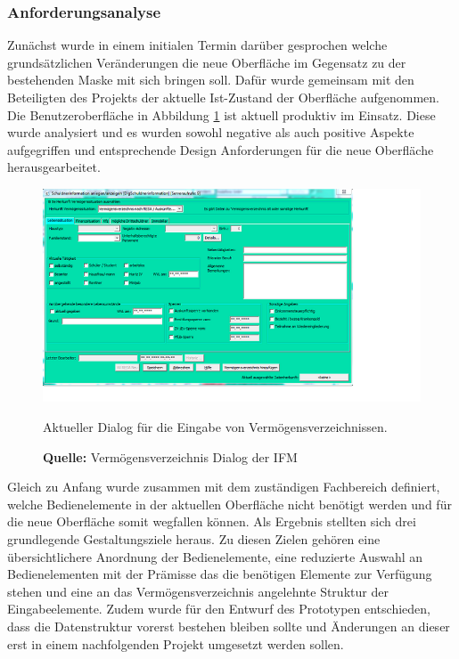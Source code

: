 \subsubsection{Anforderungsanalyse}
Zunächst wurde in einem initialen Termin darüber gesprochen welche grundsätzlichen Veränderungen die neue Oberfläche im Gegensatz zu der bestehenden Maske mit sich bringen soll. Dafür wurde gemeinsam mit den Beteiligten des Projekts der aktuelle Ist-Zustand der Oberfläche aufgenommen. Die Benutzeroberfläche in Abbildung \ref{fig:aktuellerDialog} ist aktuell produktiv im Einsatz. Diese wurde analysiert und es wurden sowohl negative als auch positive Aspekte aufgegriffen und entsprechende Design Anforderungen für die neue Oberfläche herausgearbeitet.
\begin{figure}[H]
  \centering
  \includegraphics[scale=1]{img/aktueller_Dialog.PNG}
  \caption{Aktueller Dialog für die Eingabe von Vermögensverzeichnissen.}
  \caption*{\textbf{Quelle:} Vermögensverzeichnis Dialog der IFM}
  \label{fig:aktuellerDialog}
\end{figure}

Gleich zu Anfang wurde zusammen mit dem zuständigen Fachbereich definiert, welche Bedienelemente in der aktuellen Oberfläche nicht benötigt werden und für die neue Oberfläche somit wegfallen können. Als Ergebnis stellten sich drei grundlegende Gestaltungsziele heraus. Zu diesen Zielen gehören eine übersichtlichere Anordnung der Bedienelemente, eine reduzierte Auswahl an Bedienelementen mit der Prämisse das die benötigen Elemente zur Verfügung stehen und eine an das Vermögensverzeichnis angelehnte Struktur der Eingabeelemente. Zudem wurde für den Entwurf des Prototypen entschieden, dass die Datenstruktur vorerst bestehen bleiben sollte und Änderungen an dieser erst in einem nachfolgenden Projekt umgesetzt werden sollen.

